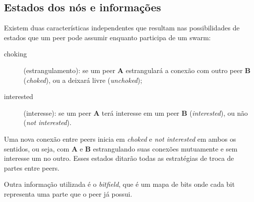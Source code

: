 
\subsection*{Estados dos nós e informações}

Existem duas características independentes que resultam nas possibilidades de estados
que um \gls*{peer} pode assumir enquanto participa de um \gls*{swarm}:

\begin{description}
    \item[choking] (estrangulamento): se um \gls*{peer} \textbf{A} estrangulará
        a conexão com outro \gls*{peer} \textbf{B} (\emph{choked}), ou a deixará livre
        (\emph{unchoked});

    \item[interested] (interesse): se um \gls*{peer} \textbf{A} terá interesse
        em um \gls*{peer} \textbf{B} (\emph{interested}), ou não (\emph{not interested}).
\end{description}

Uma nova conexão entre \glspl*{peer} inicia em \emph{choked} e \emph{not interested} em
ambos os sentidos, ou seja, com \textbf{A} e \textbf{B} estrangulando suas conexões
mutuamente e sem interesse um no outro. Esses estados ditarão todas as estratégias de
troca de partes entre \glspl*{peer}.

Outra informação utilizada é o \emph{bitfield}, que é um mapa de bits onde cada bit
representa uma parte que o \gls*{peer} já possui.